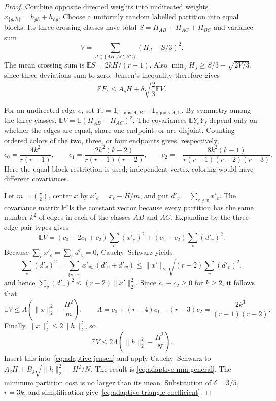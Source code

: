 \begin{proof}
Combine opposite directed weights into undirected weights
$x_{\{g,h\}}=h_{gh}+h_{hg}$.  Choose a uniformly random labelled
partition into equal blocks.  Its three crossing classes have total
$S=H_{AB}+H_{AC}+H_{BC}$ and variance sum
\[
 V=\sum_{J\in\{AB,AC,BC\}}(H_J-S/3)^2.
\]
The mean crossing sum is $\mathbb ES=2kH/(r-1)$.
Also $\min_JH_J\ge S/3-\sqrt{2V/3}$, since three deviations sum to
zero.  Jensen's inequality therefore gives
\begin{equation}\label{eq:adaptive-jensen}
 \mathbb EF_\delta\le A_\delta H+
                         \delta\sqrt{\frac23\mathbb EV}.
\end{equation}

For an undirected edge $e$, set
$Y_e=\mathbf1_{e\text{ joins }A,B}-\mathbf1_{e\text{ joins }A,C}$.
By symmetry among the three classes,
$\mathbb EV=\mathbb E(H_{AB}-H_{AC})^2$.
The covariances $\mathbb EY_eY_f$ depend only on whether the edges are
equal, share one endpoint, or are disjoint.  Counting ordered colors of
the two, three, or four endpoints gives, respectively,
\[
 c_0=\frac{4k^2}{r(r-1)},\qquad
 c_1=\frac{2k^2(k-2)}{r(r-1)(r-2)},\qquad
 c_2=-\frac{8k^2(k-1)}{r(r-1)(r-2)(r-3)}.
\]
Here the equal-block restriction is used; independent vertex coloring
would have different covariances.

Let $m=\binom r2$, center $x$ by $x'_e=x_e-H/m$, and put
$d'_v=\sum_{e\ni v}x'_e$.  The covariance matrix kills the constant
vector because every partition has the same number $k^2$ of edges in
each of the classes $AB$ and $AC$.  Expanding by the three edge-pair
types gives
\[
 \mathbb EV=(c_0-2c_1+c_2)\sum_e(x'_e)^2
                   +(c_1-c_2)\sum_v(d'_v)^2.
\]
Because $\sum_ex'_e=\sum_vd'_v=0$, Cauchy--Schwarz yields
\[
 \sum_v(d'_v)^2
 =\sum_{\{v,w\}}x'_{vw}(d'_v+d'_w)
 \le\|x'\|_2\sqrt{(r-2)\sum_v(d'_v)^2},
\]
and hence $\sum_v(d'_v)^2\le(r-2)\|x'\|_2^2$.
Since $c_1-c_2\ge0$ for $k\ge2$, it follows that
\[
 \mathbb EV\le\Lambda\left(\|x\|_2^2-\frac{H^2}{m}\right),
 \qquad
 \Lambda=c_0+(r-4)c_1-(r-3)c_2
        =\frac{2k^3}{(r-1)(r-2)}.
\]
Finally $\|x\|_2^2\le2\|h\|_2^2$, so
\[
 \mathbb EV\le2\Lambda\left(\|h\|_2^2-\frac{H^2}{N}\right).
\]
Insert this into~\eqref{eq:adaptive-jensen} and apply Cauchy--Schwarz to
$A_\delta H+B_\delta\sqrt{\|h\|_2^2-H^2/N}$.  The result is
\eqref{eq:adaptive-mm-general}.  The minimum partition cost is no larger
than its mean.  Substitution of $\delta=3/5$, $r=3k$, and simplification
give~\eqref{eq:adaptive-triangle-coefficient}.
\end{proof}

